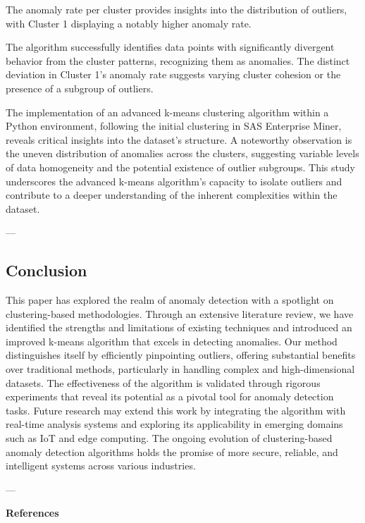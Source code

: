 \documentclass{sigkddExp}
\begin{document}
The anomaly rate per cluster provides insights into the distribution of outliers, with Cluster 1 displaying a notably higher anomaly rate.

The algorithm successfully identifies data points with significantly divergent behavior from the cluster patterns, recognizing them as anomalies. The distinct deviation in Cluster 1's anomaly rate suggests varying cluster cohesion or the presence of a subgroup of outliers.

The implementation of an advanced k-means clustering algorithm within a Python environment, following the initial clustering in SAS Enterprise Miner, reveals critical insights into the dataset's structure. A noteworthy observation is the uneven distribution of anomalies across the clusters, suggesting variable levels of data homogeneity and the potential existence of outlier subgroups. This study underscores the advanced k-means algorithm's capacity to isolate outliers and contribute to a deeper understanding of the inherent complexities within the dataset.

---

\subsection{Conclusion}

This paper has explored the realm of anomaly detection with a spotlight on clustering-based methodologies. Through an extensive literature review, we have identified the strengths and limitations of existing techniques and introduced an improved k-means algorithm that excels in detecting anomalies. Our method distinguishes itself by efficiently pinpointing outliers, offering substantial benefits over traditional methods, particularly in handling complex and high-dimensional datasets. The effectiveness of the algorithm is validated through rigorous experiments that reveal its potential as a pivotal tool for anomaly detection tasks. Future research may extend this work by integrating the algorithm with real-time analysis systems and exploring its applicability in emerging domains such as IoT and edge computing. The ongoing evolution of clustering-based anomaly detection algorithms holds the promise of more secure, reliable, and intelligent systems across various industries.



---



\textbf{References}
\end{document}
